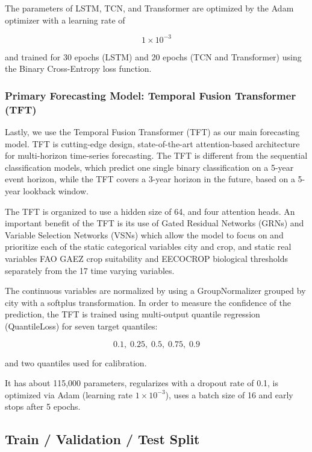\documentclass{ieeeaccess}
\begin{document}
The parameters of LSTM, TCN, and Transformer are optimized by the Adam optimizer with a learning rate of

\[
1 \times 10^{-3}
\]

and trained for 30 epochs (LSTM) and 20 epochs (TCN and Transformer) using the Binary Cross-Entropy loss function.

\subsubsection{Primary Forecasting Model: Temporal Fusion Transformer (TFT)}

Lastly, we use the Temporal Fusion Transformer (TFT) as our main forecasting model. TFT is cutting-edge design, state-of-the-art attention-based architecture for multi-horizon time-series forecasting. The TFT is different from the sequential classification models, which predict one single binary classification on a 5-year event horizon, while the TFT covers a 3-year horizon in the future, based on a 5-year lookback window.

The TFT is organized to use a hidden size of 64, and four attention heads. An important benefit of the TFT is its use of Gated Residual Networks (GRNs) and Variable Selection Networks (VSNs) which allow the model to focus on and prioritize each of the static categorical variables city and crop, and static real variables FAO GAEZ crop suitability and EECOCROP biological thresholds separately from the 17 time varying variables.

The continuous variables are normalized by using a GroupNormalizer grouped by city with a softplus transformation. In order to measure the confidence of the prediction, the TFT is trained using multi-output quantile regression (QuantileLoss) for seven target quantiles:

\[
0.1,\;0.25,\;0.5,\;0.75,\;0.9
\]

and two quantiles used for calibration.

It has about 115,000 parameters, regularizes with a dropout rate of 0.1, is optimized via Adam (learning rate $1 \times 10^{-3}$), uses a batch size of 16 and early stops after 5 epochs.

\subsection{Train / Validation / Test Split}
\end{document}
